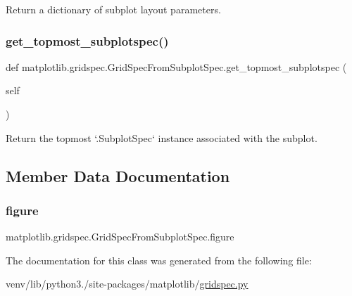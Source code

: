 \begin{DoxyVerb}Return a dictionary of subplot layout parameters.\end{DoxyVerb}
 \mbox{\label{classmatplotlib_1_1gridspec_1_1GridSpecFromSubplotSpec_af51cb71e5874185da36d693d6b126926}} 
\subsubsection{\texorpdfstring{get\+\_\+topmost\+\_\+subplotspec()}{get\_topmost\_subplotspec()}}
{\footnotesize\ttfamily def matplotlib.\+gridspec.\+Grid\+Spec\+From\+Subplot\+Spec.\+get\+\_\+topmost\+\_\+subplotspec (\begin{DoxyParamCaption}\item[{}]{self }\end{DoxyParamCaption})}

\begin{DoxyVerb}Return the topmost `.SubplotSpec` instance associated with the subplot.
\end{DoxyVerb}
 

\subsection{Member Data Documentation}
\mbox{\label{classmatplotlib_1_1gridspec_1_1GridSpecFromSubplotSpec_aeb52c0ce6361ec58309418d2e4000664}} 
\subsubsection{\texorpdfstring{figure}{figure}}
{\footnotesize\ttfamily matplotlib.\+gridspec.\+Grid\+Spec\+From\+Subplot\+Spec.\+figure}



The documentation for this class was generated from the following file\+:\begin{DoxyCompactItemize}
\item 
venv/lib/python3./site-\/packages/matplotlib/\hyperlink{gridspec_8py}{gridspec.\+py}\end{DoxyCompactItemize}
